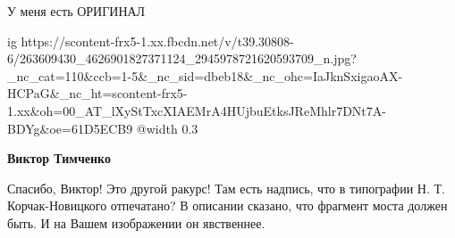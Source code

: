  
 
 
 
 

У меня есть ОРИГИНАЛ

\ifcmt
  ig https://scontent-frx5-1.xx.fbcdn.net/v/t39.30808-6/263609430_4626901827371124_2945978721620593709_n.jpg?_nc_cat=110&ccb=1-5&_nc_sid=dbeb18&_nc_ohc=IaJknSxigaoAX-HCPaG&_nc_ht=scontent-frx5-1.xx&oh=00_AT_lXyStTxcXIAEMrA4HUjbuEtksJReMhlr7DNt7A-BDYg&oe=61D5ECB9
  @width 0.3
\fi

\textbf{Виктор Тимченко} 

Спасибо, Виктор! Это другой ракурс! Там есть надпись, что в типографии Н. Т.
Корчак-Новицкого отпечатано? В описании сказано, что фрагмент моста должен
быть. И на Вашем изображении он явственнее.
